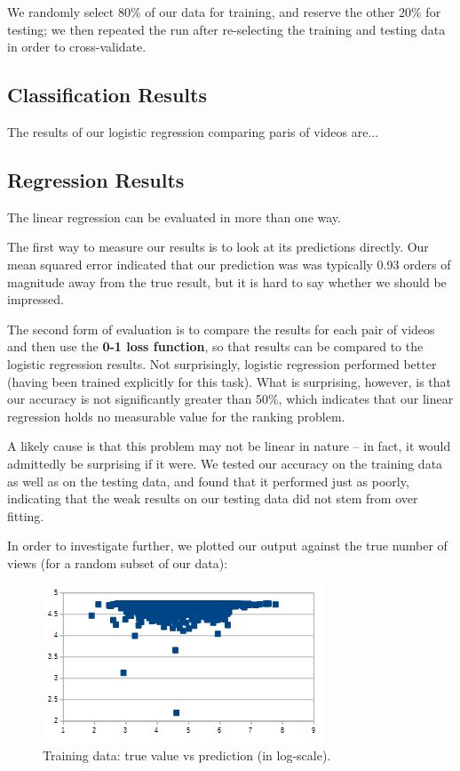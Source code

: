 We randomly select 80\% of our data for training, and reserve the other 20\% for testing; we then repeated the run after re-selecting the training and testing data in order to cross-validate.

\subsection{Classification Results}
	The results of our logistic regression comparing paris of videos are...
	
	
\subsection{Regression Results}
	The linear regression can be evaluated in more than one way.
	
	The first way to measure our results is to look at its predictions directly.  Our mean squared error indicated that our prediction was was typically 0.93 orders of magnitude away from the true result, but it is hard to say whether we should be impressed.
	
	The second form of evaluation is to compare the results for each pair of videos and then use the \textbf{0-1 loss function}, so that results can be compared to the logistic regression results.  Not surprisingly, logistic regression performed better (having been trained explicitly for this task).  What is surprising, however, is that our accuracy is not significantly greater than 50\%, which indicates that our linear regression holds no measurable value for the ranking problem.
	
	A likely cause is that this problem may not be linear in nature -- in fact, it would admittedly be surprising if it were.  We tested our accuracy on the training data as well as on the testing data, and found that it performed just as poorly, indicating that the weak results on our testing data did not stem from over fitting.
	
	In order to investigate further, we plotted our output against the true number of views (for a random subset of our data):

	\begin{figure}[!h]
		\begin{center}
			\includegraphics[width=.75\textwidth,clip]{logistic regression training.png}
		\end{center}
		\caption{Training data: true value vs prediction (in log-scale).}
		\label{fig:trainingTrueVsPredicted}
	\end{figure}
	
